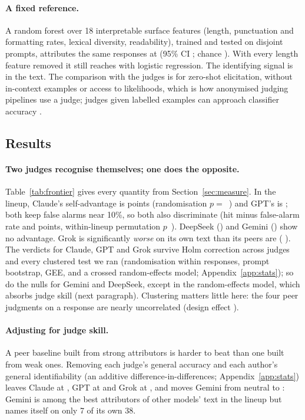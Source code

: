 \paragraph{A fixed reference.} A random forest over 18 interpretable surface
features (length, punctuation and formatting rates, lexical diversity,
readability), trained and tested on disjoint prompts, attributes the same
responses at \EngineAAcc{} (95\% CI \EngineACI{}; chance \Chance{}). With
every length feature removed it still reaches \EngineALengthFreeLR{} with
logistic regression. The identifying signal is in the text. The comparison
with the judges is for zero-shot elicitation, without in-context examples or
access to likelihoods, which is how anonymised judging pipelines use a judge;
judges given labelled examples can approach classifier accuracy
\citep{dietrich2026splits}.

\subsection{Results}


\paragraph{Two judges recognise themselves; one does the opposite.}
Table~\ref{tab:frontier} gives every quantity from
Section~\ref{sec:measure}. In the lineup, Claude's self-advantage is
\ClaudeAdvLineup{} points \ClaudeAdvLineupCI{} (randomisation
$p=$~\ClaudeAdvLineupP{}) and GPT's is \GPTAdvLineup{} \GPTAdvLineupCI{};
both keep false alarms near 10\%, so both also discriminate (hit minus
false-alarm rate \ClaudeDiscLineup{} and \GPTDiscLineup{} points,
within-lineup permutation $p$~\ClaudeDiscLineupHolm{}). DeepSeek (\DeepSeekAdvLineup{}) and Gemini
(\GeminiAdvLineup{}) show no advantage. Grok is significantly \emph{worse} on
its own text than its peers are (\GrokAdvLineup{} \GrokAdvLineupCI{}). The
verdicts for Claude, GPT and Grok survive Holm correction across judges and
every clustered test we ran (randomisation within responses, prompt
bootstrap, GEE, and a crossed random-effects model;
Appendix~\ref{app:stats}); so do the nulls for Gemini and DeepSeek, except
in the random-effects model, which absorbs judge skill (next paragraph). Clustering matters
little here: the four peer judgments on a response are nearly uncorrelated
(design effect \PeerDeffLineup{}).

\paragraph{Adjusting for judge skill.} A peer baseline built from strong
attributors is harder to beat than one built from weak ones. Removing each
judge's general accuracy and each author's general identifiability (an
additive difference-in-differences; Appendix~\ref{app:stats}) leaves Claude
at \ClaudeAdjAdvLineup{} \ClaudeAdjAdvLineupCI{}, GPT at \GPTAdjAdvLineup{}
\GPTAdjAdvLineupCI{} and Grok at \GrokAdjAdvLineup{}
\GrokAdjAdvLineupCI{}, and moves Gemini from neutral to
\GeminiAdjAdvLineup{} \GeminiAdjAdvLineupCI{}: Gemini is among the best
attributors of other models' text in the lineup but names itself on only 7 of
its own 38.

